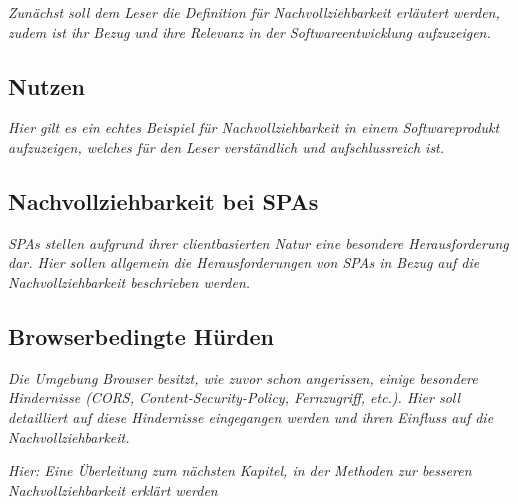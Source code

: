 \textit{Zunächst soll dem Leser die Definition für Nachvollziehbarkeit erläutert werden, zudem ist ihr Bezug und ihre Relevanz in der Softwareentwicklung aufzuzeigen.}
	
\subsection{Nutzen}
	
\textit{Hier gilt es ein echtes Beispiel für Nachvollziehbarkeit in einem Softwareprodukt aufzuzeigen, welches für den Leser verständlich und aufschlussreich ist.}
	
\subsection{Nachvollziehbarkeit bei SPAs}
	
\textit{SPAs stellen aufgrund ihrer clientbasierten Natur eine besondere Herausforderung dar. Hier sollen allgemein die Herausforderungen von SPAs in Bezug auf die Nachvollziehbarkeit beschrieben werden.}

\subsection{Browserbedingte Hürden}

\textit{Die Umgebung Browser besitzt, wie zuvor schon angerissen, einige besondere Hindernisse (CORS, Content-Security-Policy, Fernzugriff, etc.). Hier soll detailliert auf diese Hindernisse eingegangen werden und ihren Einfluss auf die Nachvollziehbarkeit.}

\textit{Hier: Eine Überleitung zum nächsten Kapitel, in der Methoden zur besseren Nachvollziehbarkeit erklärt werden}